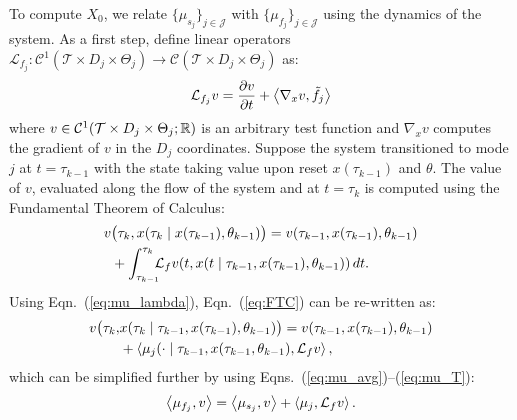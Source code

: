 To compute $X_0$, we relate $\{\mu_{s_j}\}_{j\in \mathcal J}$ with $\{\mu_{f_j}\}_{j\in \mathcal J}$ using the dynamics of the system.
As a first step, define linear operators {$\mathcal L_{ f_j}\colon \mathcal C^1(\mathcal T\times D_j\times \Theta_j)\rightarrow \mathcal C(\mathcal T\times D_j\times \Theta_j)$} as:
\begin{align}
      \mathcal L_{f_j}v=\frac{\partial v}{\partial t}+\left\langle \nabla_x v,\tilde f_j\right\rangle
    \label{eq:Lv}
\end{align}
where $v\in \mathcal C^1(\mathcal T\times D_j\times \Theta_j;\mathbb{R})$ is an arbitrary test function and $\nabla_x v$ computes the gradient of $v$ in the $D_j$ coordinates.
Suppose the system transitioned to mode $j$ at \mbox{$t=\tau_{k-1}$} with the state taking value upon reset $x(\tau_{k-1})$ and $\theta$.
The value of $v$, evaluated along the flow of the system and at $t=\tau_{k}$ is computed using the Fundamental Theorem of Calculus:
\begin{align}
\begin{aligned}
    v& \big(\tau_k,x(\tau_{k}\mid x(\tau_{k-1}),\theta_{k-1})\big)=v(\tau_{k-1},x(\tau_{k-1}),\theta_{k-1})\\
    &+\int_{\tau_{k-1}}^{\tau_{k}}\hspace*{-2mm}\mathcal L_{f}v(t,x(t\mid \tau_{k-1},x(\tau_{k-1}),\theta_{k-1}))\,dt.
\end{aligned}
\label{eq:FTC}
\end{align}
Using Eqn.~(\ref{eq:mu_lambda}), Eqn.~(\ref{eq:FTC}) can be re-written as:
\small
\begin{align}
\begin{aligned}
    v\big(\tau_k,&x(\tau_{k}\mid \tau_{k-1},x(\tau_{k-1}),\theta_{k-1})\big)=v(\tau_{k-1},x(\tau_{k-1}),\theta_{k-1})\\
    &+\left\langle \mu_j(\cdot\mid \tau_{k-1},x(\tau_{k-1},\theta_{k-1}),\mathcal L_{ f}v\right\rangle,
\end{aligned}
\end{align}
\normalsize
which can be simplified further by using Eqns.~(\ref{eq:mu_avg})--(\ref{eq:mu_T}):
\begin{align}
  \left\langle \mu_{f_j},v\right\rangle=\left\langle \mu_{s_j},v\right\rangle+\left\langle \mu_{j},\mathcal L_{f}v\right\rangle.
  \label{eq:liouville_1}
\end{align}


